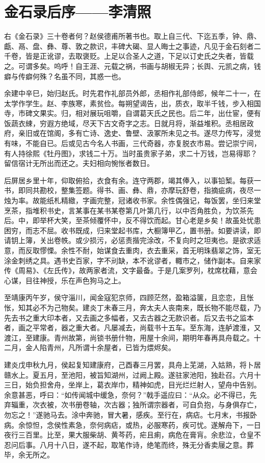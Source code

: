 \section{金石录后序——李清照}

右《金石录》三十卷者何？赵侯德甫所著书也。取上自三代、下迄五季，钟、鼎、甗、鬲、盘、彝、尊、敦之款识，丰碑大碣、显人晦士之事迹，凡见于金石刻者二千卷，皆是正讹谬，去取褒贬。上足以合圣人之道，下足以订史氏之失者，皆载之。可谓多矣。呜呼！自王涯、元载之祸，书画与胡椒无异；长舆、元凯之病，钱癖与传癖何殊？名虽不同，其惑一也。


余建中辛巳，始归赵氏。时先君作礼部员外郎，丞相作礼部侍郎，候年二十一，在太学作学生。赵、李族寒，素贫俭。每朔望谒告，出，质衣，取半千钱，步入相国寺，市碑文果实。归，相对展玩咀嚼，自谓葛天氏之民也。后二年，出仕宦，便有饭蔬衣綀，穷遐方绝域，尽天下古文奇字之志。日就月将，渐益堆积。丞相居政府，亲旧或在馆阁，多有亡诗、逸史、鲁壁、汲冢所未见之书。遂尽力传写，浸觉有味，不能自已。后或见古今名人书画，三代奇器，亦复脱衣市易。尝记崇宁间，有人持徐熙《牡丹图》，求钱二十万。当时虽贵家子弟，求二十万钱，岂易得耶？留信宿计无所出而还之。夫妇相向惋怅者数日。


后屏居乡里十年，仰取俯拾，衣食有余。连守两郡，竭其俸入，以事铅椠。每获一书，即同共勘校，整集签题。得书、画、彝、鼎，亦摩玩舒卷，指摘疵病，夜尽一烛为率。故能纸札精緻，字画完整，冠诸收书家。余性偶强记，每饭罢，坐归来堂烹茶，指堆积书史，言某事在某书某卷第几叶第几行，以中否角胜负，为饮茶先后。中，即举杯大笑，至茶倾覆怀中，反不得饮而起。甘心老是乡矣！故虽处忧患困穷，而志不屈。收书既成，归来堂起书库，大橱簿甲乙，置书册。如要讲读，即请钥上簿，关出卷帙。或少损污，必惩责揩完涂改，不复向时之坦夷也。是欲求适意，而反取憀慄。余性不耐，始谋食去重肉，衣去重采，首无明珠翡翠之饰，室无涂金刺绣之具。遇书史百家，字不刓缺，本不讹谬者，輙市之，储作副本。自来家传《周易》、《左氏传》，故两家者流，文字最备。于是几案罗列，枕席枕藉，意会心谋，目往神授，乐在声色狗马之上。


至靖康丙午岁，侯守淄川，闻金寇犯京师，四顾茫然，盈箱溢箧，且恋恋，且怅怅，知其必不为己物矣。建炎丁未春三月，奔太夫人丧南来，既长物不能尽载，乃先去书之重大印本者，又去画之多幅者，又去古器之无款识者。后又去书之监本者，画之平常者，器之重大者。凡屡减去，尚载书十五车。至东海，连舻渡淮，又渡江，至建康。青州故第，尚锁书册什物，用屋十余间，期明年春再具舟载之。十二月，金人陷青州，凡所谓十余屋者，已皆为煨烬矣。


建炎戊申秋九月，侯起复知建康府，己酉春三月罢，具舟上芜湖，入姑熟，将卜居赣水上。夏五月，至池阳，被旨知湖州，过阙上殿。遂驻家池阳，独赴召。六月十三日，始负担舍舟，坐岸上，葛衣岸巾，精神如虎，目光烂烂射人，望舟中告别。余意甚恶，呼曰：“如传闻城中缓急，奈何？”戟手遥应曰：“从众。必不得已，先弃辎重，次衣被，次书册卷轴，次古器；独所谓宗器者，可自负抱，与身俱存亡，勿忘之！”遂驰马去。涂中奔驰，冒大暑，感疾。至行在，病痁。七月末，书报卧病。余惊怛，念侯性素急，奈何病痁，或热，必服寒药，疾可忧。遂解舟下，一日夜行三百里。比至，果大服柴胡、黄芩药，疟且痢，病危在膏肓。余悲泣，仓皇不忍问后事。八月十八日，遂不起，取笔作诗，绝笔而终，殊无分香卖屦之意。葬毕，余无所之。



